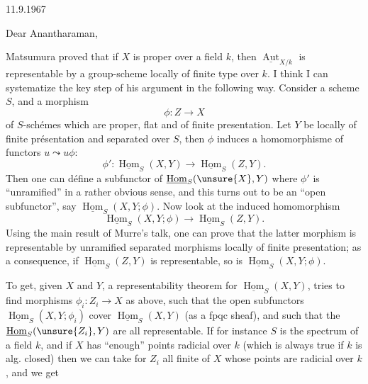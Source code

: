 11.9.1967

Dear Anantharaman,

Matsumura proved that if $X$ is proper over a field $k$, then $\underline{\operatorname{Aut}}_{X/k}$ is representable by a group-scheme locally of finite type over $k$. I think I can systematize the key step of his argument in the following way. Consider a scheme $S$, and a morphism
\[
\phi:Z\longrightarrow X
\]
of $S$-schémes which are proper, flat and of finite presentation. Let $Y$ be locally of finite présentation and separated over $S$, then $\phi$ induces a homomorphisme of functors $u\leadsto u\phi$:
\[
\phi':\underline{\operatorname{Hom}}_S(X,Y)\longrightarrow\underline{\operatorname{Hom}}_S(Z,Y).
\]
Then one can défine a subfunctor of $\underline{\operatorname{Hom}}_S(\unsure{X},Y)$ where $\phi'$ is ``unramified'' in a rather obvious sense, and this turns out to be an ``open subfunctor'', say $\underline{\operatorname{Hom}}_S(X,Y;\phi)$. Now look at the induced homomorphism
\[
\underline{\operatorname{Hom}}_S(X,Y;\phi)\longrightarrow\underline{\operatorname{Hom}}_S(Z,Y).
\]
Using the main result of Murre's talk, one can prove that the latter morphism is representable by unramified separated morphisms locally of finite presentation; as a consequence, if $\underline{\operatorname{Hom}}_S(Z,Y)$ is representable, so is $\underline{\operatorname{Hom}}_S(X,Y;\phi)$.

To get, given $X$ and $Y$, a representability theorem for $\underline{\operatorname{Hom}}_S(X,Y)$,  tries to find morphisms $\phi_i:Z_i\longrightarrow X$ as above, such that the open subfunctors $\underline{\operatorname{Hom}}_S(X,Y;\phi_i)$ cover $\underline{\operatorname{Hom}}_S(X,Y)$ (as a fpqc sheaf), and such that the  $\underline{\operatorname{Hom}}_S(\unsure{Z_i},Y)$ are all representable. If for instance $S$ is the spectrum of a field $k$, and if $X$ has ``enough'' points radicial over $k$ (which is always true if $k$ is alg. closed) then we can take for $Z_i$ all finite  of $X$ whose points are radicial over $k$, and we get
